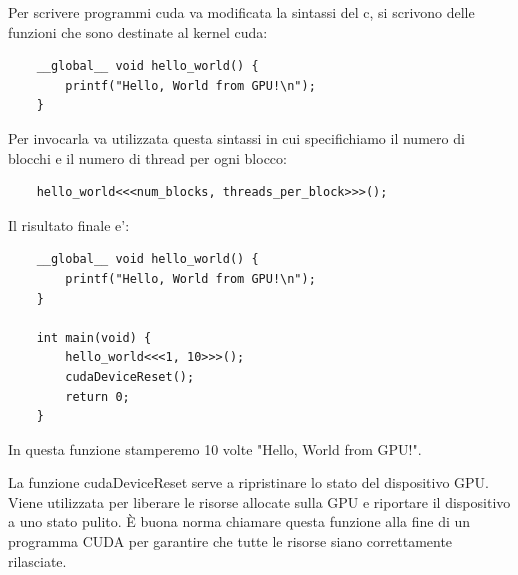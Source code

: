 Per scrivere programmi cuda va modificata la sintassi del c, si scrivono delle funzioni che sono destinate al kernel cuda:
\begin{lstlisting}
    __global__ void hello_world() {
        printf("Hello, World from GPU!\n");
    }
\end{lstlisting}

Per invocarla va utilizzata questa sintassi in cui specifichiamo il numero di blocchi e il numero di thread per ogni blocco:
\begin{lstlisting}
    hello_world<<<num_blocks, threads_per_block>>>();
\end{lstlisting}

Il risultato finale e':
\begin{lstlisting}
    __global__ void hello_world() {
        printf("Hello, World from GPU!\n");
    }

    int main(void) {
        hello_world<<<1, 10>>>();
        cudaDeviceReset();
        return 0;
    }
\end{lstlisting}

In questa funzione stamperemo 10 volte "Hello, World from GPU!".

La funzione cudaDeviceReset serve a ripristinare lo stato del dispositivo GPU. Viene utilizzata per liberare le risorse allocate sulla GPU e riportare il dispositivo a uno stato pulito. È buona norma chiamare questa funzione alla fine di un programma CUDA per garantire che tutte le risorse siano correttamente rilasciate.